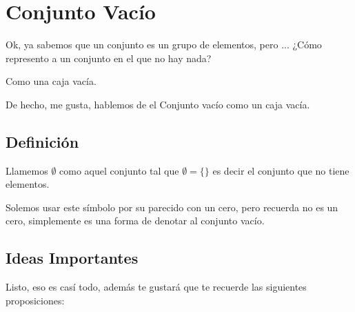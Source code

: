 \documentclass[12pt, fleqn]{report}                             %
\theoremstyle{break}                                            %
\begin{document}
        \clearpage
        \section{Conjunto Vacío}
                
            Ok, ya sabemos que un conjunto es un grupo de elementos, pero ...
            ¿Cómo represento a un conjunto en el que no hay nada?

            Como una caja vacía.

            De hecho, me gusta, hablemos de el Conjunto vacío como un caja vacía.

            \subsection{Definición}

                Llamemos $\emptyset$ como aquel conjunto tal que $\emptyset = \{ \}$ es decir el
                conjunto que no tiene elementos.

                Solemos usar este símbolo por su parecido con un cero, pero recuerda no es un cero,
                simplemente
                es una forma de denotar al conjunto vacío.


            \subsection{Ideas Importantes}

                Listo, eso es casí todo, además te gustará que te recuerde las siguientes
                proposiciones:
\end{document}
